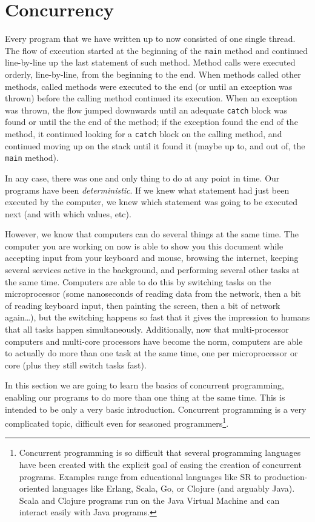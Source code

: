 \section{Concurrency}
\label{sec:concurrency}


Every program that we have written up to now consisted of one single
thread. The flow of execution started at the beginning of
the \verb+main+ method and continued line-by-line up the last
statement of such method. Method calls were executed orderly,
line-by-line, from the beginning to the end. When methods called other
methods, called methods were executed to the end (or until an
exception was thrown) before the calling method continued its
execution. When an exception was thrown, the flow jumped downwards
until an adequate \verb+catch+ block was found or until the the end of
the method; if the exception found the end of the method, it continued
looking for a \verb+catch+ block on the calling
method, and continued moving up on the stack until it found it 
(maybe up to, and out of, the \verb+main+ method). 

In any case, there was one and only thing to do at any point in
time. Our programs have been \emph{deterministic}. If we knew what
statement had just been executed by the computer, we knew which
statement was going to be executed next (and with which values, etc). 

However, we know that computers can do several things at the same
time. The computer you are working on now is able to show you this
document while accepting input from your keyboard and mouse, 
browsing the internet, 
keeping several services active in the background, and
performing several other tasks at the same time. 
Computers are able to do this by
switching tasks on the microprocessor (some nanoseconds of reading data from the
network, then a bit of reading keyboard input, then painting the
screen, then a bit of network again\ldots), but the switching happens so
fast that it gives the impression to humans that all tasks happen
simultaneously. Additionally, now that multi-processor computers and
multi-core processors have become the norm, computers are able to
actually do more than one task at the same time, one per
microprocessor or core (plus they still
switch tasks fast).

In this section we are going to learn the basics of concurrent
programming, enabling our programs to do more than one thing at the
same time. This is intended to be only a very basic
introduction. Concurrent programming is a very complicated topic,
difficult even
for seasoned programmers\footnote{Concurrent programming is so
  difficult that several programming languages have been 
  created with the explicit goal of easing the creation of concurrent
  programs. Examples range from educational languages like SR to
  production-oriented languages like Erlang, Scala, Go, or
  Clojure (and arguably Java). 
  Scala and Clojure programs run on the Java Virtual Machine and can
  interact easily with Java programs.}. 

